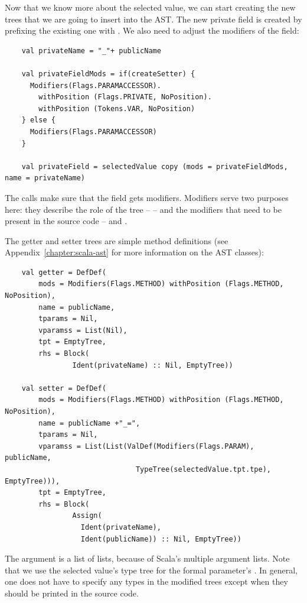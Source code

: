 \documentclass[10pt,a4paper,oneside]{scrreprt}
\begin{document}
Now that we know more about the selected value, we can start creating the new trees that we are going to insert into the AST. The new private field is created by prefixing the existing one with \src{\_}. We also need to adjust the modifiers of the field:

\begin{lstlisting}
    val privateName = "_"+ publicName
    
    val privateFieldMods = if(createSetter) {
      Modifiers(Flags.PARAMACCESSOR).
        withPosition (Flags.PRIVATE, NoPosition).
        withPosition (Tokens.VAR, NoPosition)
    } else {
      Modifiers(Flags.PARAMACCESSOR)
    }
      
    val privateField = selectedValue copy (mods = privateFieldMods, name = privateName)
\end{lstlisting}

The  calls make sure that the field gets  modifiers. Modifiers serve two purposes here: they describe the role of the tree -- \textsc{} -- and the modifiers that need to be present in the source code -- \textsc{} and \textsc{}.

The getter and setter trees are simple method definitions (see Appendix~\vref{chapter:scala-ast} for more information on the AST classes):

\begin{lstlisting}
    val getter = DefDef(
        mods = Modifiers(Flags.METHOD) withPosition (Flags.METHOD, NoPosition), 
        name = publicName, 
        tparams = Nil, 
        vparamss = List(Nil), 
        tpt = EmptyTree, 
        rhs = Block(
                Ident(privateName) :: Nil, EmptyTree))
    
    val setter = DefDef(
        mods = Modifiers(Flags.METHOD) withPosition (Flags.METHOD, NoPosition), 
        name = publicName +"_=",
        tparams = Nil,
        vparamss = List(List(ValDef(Modifiers(Flags.PARAM), publicName, 
                               TypeTree(selectedValue.tpt.tpe), EmptyTree))), 
        tpt = EmptyTree,
        rhs = Block(
                Assign(
                  Ident(privateName),
                  Ident(publicName)) :: Nil, EmptyTree))
\end{lstlisting}

The  argument is a list of lists, because of Scala's multiple argument lists. Note that we use the selected value's type tree for the formal parameter's . In general, one does not have to specify any types in the modified trees except when they should be printed in the source code.
\end{document}
